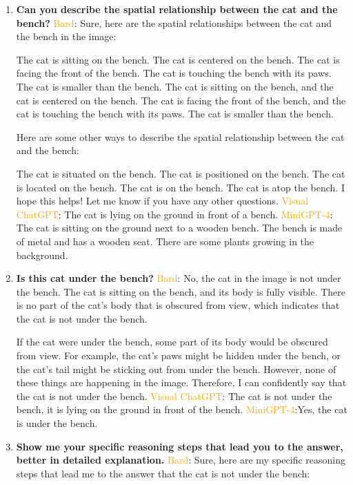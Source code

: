    \begin{enumerate}
        \item \textbf{Can you describe the spatial relationship between the cat and the bench?}
        \subitem \textcolor{orange}{Bard}:
        Sure, here are the spatial relationships between the cat and the bench in the image:

        The cat is sitting on the bench.
        The cat is centered on the bench.
        The cat is facing the front of the bench.
        The cat is touching the bench with its paws.
        The cat is smaller than the bench.
        The cat is sitting on the bench, and the cat is centered on the bench. The cat is facing the front of the bench, and the cat is touching the bench with its paws. The cat is smaller than the bench.

        Here are some other ways to describe the spatial relationship between the cat and the bench:

        The cat is situated on the bench.
        The cat is positioned on the bench.
        The cat is located on the bench.
        The cat is on the bench.
        The cat is atop the bench.
        I hope this helps! Let me know if you have any other questions.
        \subitem \textcolor{orange}{Visual ChatGPT}: The cat is lying on the ground in front of a bench.
        \subitem \textcolor{orange}{MiniGPT-4}: The cat is sitting on the ground next to a wooden bench. The bench is made of metal and has a wooden seat. There are some plants growing in the background.
        \item \textbf{Is this cat under the bench?}
        \subitem \textcolor{orange}{Bard}: No, the cat in the image is not under the bench. The cat is sitting on the bench, and its body is fully visible. There is no part of the cat's body that is obscured from view, which indicates that the cat is not under the bench.

        If the cat were under the bench, some part of its body would be obscured from view. For example, the cat's paws might be hidden under the bench, or the cat's tail might be sticking out from under the bench. However, none of these things are happening in the image. Therefore, I can confidently say that the cat is not under the bench.
        \subitem \textcolor{orange}{Visual ChatGPT}: The cat is not under the bench, it is lying on the ground in front of the bench.
        \subitem \textcolor{orange}{MiniGPT-4}:Yes, the cat is under the bench.
        \item \textbf{Show me your specific reasoning steps that lead you to the answer, better in detailed explanation.}
        \subitem \textcolor{orange}{Bard}: 
        Sure, here are my specific reasoning steps that lead me to the answer that the cat is not under the bench:
        

\end{enumerate}
